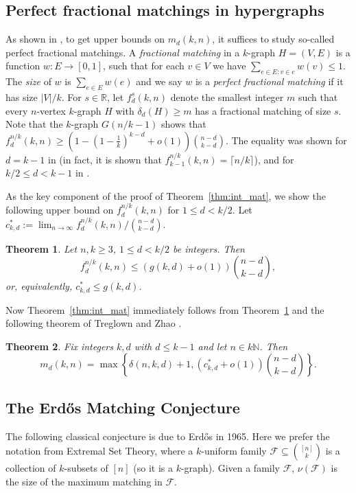 \documentclass{amsart}
\newtheorem{theorem}{Theorem}
\theoremstyle{plain}
\numberwithin{equation}{section}
\numberwithin{theorem}{section}
\numberwithin{case}{section}
\numberwithin{subcase}{case}
\begin{document}
\subsection{Perfect fractional matchings in hypergraphs}

As shown in \cite{AFHRRS, KOTo, TrZh15}, to get upper bounds on $m_d(k,n)$, it suffices to study so-called perfect fractional matchings.
A \emph{fractional matching} in a $k$-graph $H=(V, E)$ is a function $w:E\rightarrow [0,1]$, such that for each $v\in V$ we have $\sum_{e\in E:v\in e}w(v)\le 1$.
The \emph{size} of $w$ is $\sum_{e\in E} w(e)$ and we say $w$ is a \emph{perfect fractional matching} if it has size $|V|/k$.
For $s\in \mathbb{R}$, let $f_d^s(k,n)$ denote the smallest integer $m$ such that every $n$-vertex $k$-graph $H$ with $\delta_d(H)\ge m$ has a fractional matching of size $s$.
Note that the $k$-graph $G(n/k-1)$ shows that $f_{d}^{n/k}(k,n) \ge \left(1- \left(1- \frac{1}{k} \right)^{k-d} +o(1) \right)\binom{n-d}{k-d}$.
The equality was shown for $d=k-1$ in \cite{RRS09} (in fact, it is shown that $f_{k-1}^{n/k}(k,n) = \lceil n/k \rceil$), and for $k/2\le d< k-1$ in \cite{KOTo}.

As the key component of the proof of Theorem~\ref{thm:int_mat}, we show the following upper bound on $f_d^{n/k}(k,n)$ for $1\le d<k/2$.
Let $c_{k,d}^*:=\lim_{n\rightarrow \infty} f_d^{n/k}(k,n)/\binom{n-d}{k-d}$.

\begin{theorem}\label{thm:frac_mat}
Let $n, k\ge 3$, $1\le d< k/2$ be integers. Then
\begin{equation*}
f_d^{n/k}(k,n) \le \left( g(k,d) + o(1) \right) \binom{n-d}{k-d},
\end{equation*}
or, equivalently, $c_{k,d}^* \le g(k,d)$.
\end{theorem}

Now Theorem~\ref{thm:int_mat} immediately follows from Theorem~\ref{thm:frac_mat} and the following theorem of Treglown and Zhao \cite[Theorem 2]{TrZh15}. 
\begin{theorem}\cite{TrZh15}\label{thm:TrZh}
Fix integers $k,d$ with $d\le k-1$ and let $n\in k\mathbb{N}$. Then
\[
m_d(k,n) = \max \left\{ \delta(n,k,d)+1, (c^*_{k,d}+o(1))\binom{n-d}{k-d} \right\}.
\]
\end{theorem}

\subsection{The Erd\H{o}s Matching Conjecture}
The following classical conjecture is due to Erd\H{o}s \cite{erdos65} in 1965.
Here we prefer the notation from Extremal Set Theory, where a $k$-uniform family ${\mathcal{F}}\subseteq \binom{[n]}{k}$ is a collection of $k$-subsets of $[n]$ (so it is a $k$-graph).
Given a family ${\mathcal{F}}$, $\nu({\mathcal{F}})$ is the size of the maximum matching in ${\mathcal{F}}$.
\end{document}
